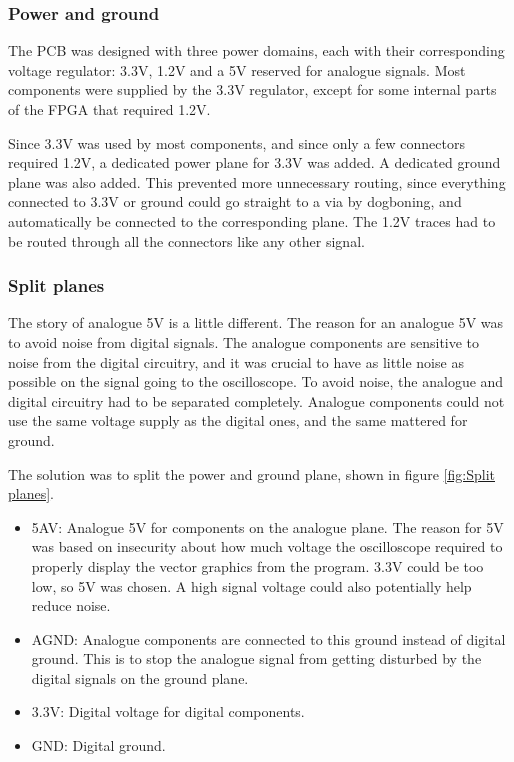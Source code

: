 \subsubsection{Power and ground}
\label{Power}
The PCB was designed with three power domains, each with their corresponding voltage regulator: 3.3V, 1.2V and a 5V reserved for analogue signals.
Most components were supplied by the 3.3V regulator, except for some internal parts of the FPGA that required 1.2V.

Since 3.3V was used by most components, and since only a few connectors required 1.2V, a dedicated power plane for 3.3V was added.
A dedicated ground plane was also added.
This prevented more unnecessary routing, since everything connected to 3.3V or ground could go straight to a via by dogboning, and automatically be connected to the corresponding plane. 
The 1.2V traces had to be routed through all the connectors like any other signal. 

\subsubsection{Split planes}
The story of analogue 5V is a little different. 
The reason for an analogue 5V was to avoid noise from digital signals. 
The analogue components are sensitive to noise from the digital circuitry, and it was crucial to have as little noise as possible on the signal going to the oscilloscope. 
To avoid noise, the analogue and digital circuitry had to be separated completely. 
Analogue components could not use the same voltage supply as the digital ones, and the same mattered for ground.

The solution was to split the power and ground plane, shown in figure \ref{fig:Split planes}. 
\begin{itemize}
\item 5AV: Analogue 5V for components on the analogue plane. 
The reason for 5V was based on insecurity about how much voltage the oscilloscope required to properly display the vector graphics from the program. 
3.3V could be too low, so 5V was chosen. 
A high signal voltage could also potentially help reduce noise.
\item AGND: Analogue components are connected to this ground instead of digital ground. 
This is to stop the analogue signal from getting disturbed by the digital signals on the ground plane.
\item 3.3V: Digital voltage for digital components.
\item GND: Digital ground.
\end{itemize}

